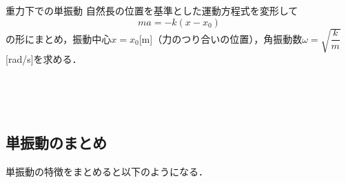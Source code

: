  \begin{matome}{重力下での単振動}
 \hspace{5mm} 自然長の位置を基準とした運動方程式を変形して
 \[ ma=-k(x-x_0) \]
 \hspace{5mm} の形にまとめ，振動中心$x=x_0$[m]（力のつり合いの位置），角振動数$\omega=\sqrt{\dfrac{k}{m}}$[rad/s]を求める．
 \end{matome}
 
  
 \ 
 
%

 \ 
 
 \subsection{単振動のまとめ}
 
 単振動の特徴をまとめると以下のようになる．
 
